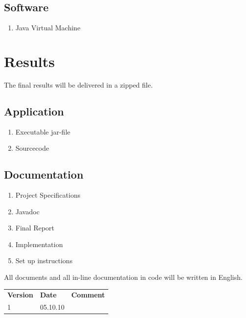 \documentclass[a4paper,10pt,titlepage]{article}
\begin{document}

\subsection{Software}
\begin{enumerate}
 \item Java Virtual Machine
\end{enumerate}


\section{Results}

The final results will be delivered in a zipped file.

\subsection{Application}
\begin{enumerate}
 \item Executable jar-file%
 \item Sourcecode
\end{enumerate}

\subsection{Documentation}
\begin{enumerate}
 \item Project Specifications
 \item Javadoc
 \item Final Report
 \item Implementation
 \item Set up instructions
\end{enumerate}

All documents and all in-line documentation in code will be written in English.


\newpage
\begin{tabularx}{\textwidth}{XXX}
\textbf{Version} & \textbf{Date} & \textbf{Comment}\\
1 & 05.10.10 & \\
\end{tabularx}
\end{document}
